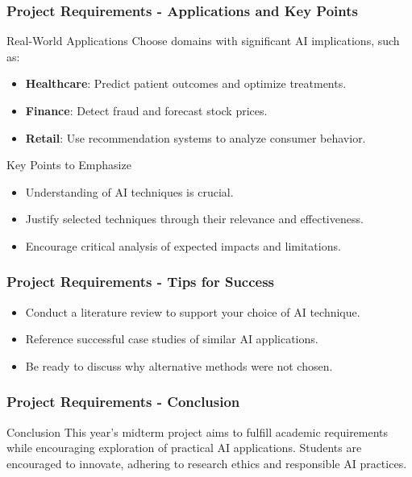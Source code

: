 \documentclass{beamer}
\begin{document}
\begin{frame}[fragile]
    \frametitle{Project Requirements - Applications and Key Points}
    \begin{block}{Real-World Applications}
        Choose domains with significant AI implications, such as:
        \begin{itemize}
            \item \textbf{Healthcare}: Predict patient outcomes and optimize treatments.
            \item \textbf{Finance}: Detect fraud and forecast stock prices.
            \item \textbf{Retail}: Use recommendation systems to analyze consumer behavior.
        \end{itemize}
    \end{block}

    \begin{block}{Key Points to Emphasize}
        \begin{itemize}
            \item Understanding of AI techniques is crucial.
            \item Justify selected techniques through their relevance and effectiveness.
            \item Encourage critical analysis of expected impacts and limitations.
        \end{itemize}
    \end{block}
\end{frame}

\begin{frame}[fragile]
    \frametitle{Project Requirements - Tips for Success}
    \begin{itemize}
        \item Conduct a literature review to support your choice of AI technique.
        \item Reference successful case studies of similar AI applications.
        \item Be ready to discuss why alternative methods were not chosen.
    \end{itemize}
\end{frame}

\begin{frame}[fragile]
    \frametitle{Project Requirements - Conclusion}
    \begin{block}{Conclusion}
        This year's midterm project aims to fulfill academic requirements while encouraging exploration of practical AI applications. Students are encouraged to innovate, adhering to research ethics and responsible AI practices.
    \end{block}
\end{frame}
\end{document}
